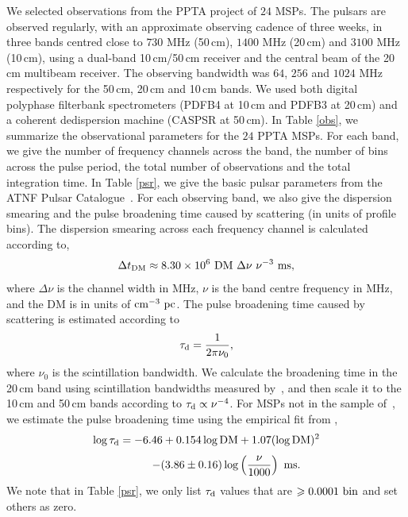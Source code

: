 \documentclass[useAMS,usenatbib]{mn2e}
\begin{document}
We selected observations from the PPTA project of $24$ MSPs. 
%
The pulsars are observed regularly, with an approximate observing cadence of 
three weeks, in three bands centred close to $730$ MHz (50\,cm), $1400$ MHz (20\,cm) and $3100$ MHz (10\,cm), 
using a dual-band 10\,cm/50\,cm receiver and the central beam 
of the 20\,cm multibeam receiver. The observing 
bandwidth was $64$, $256$ and $1024$ MHz respectively for the 50\,cm, 20\,cm 
and 10\,cm bands. 
%
We used both digital polyphase filterbank spectrometers (PDFB4 at 10\,cm 
and PDFB3 at 20\,cm) and a coherent dedispersion machine (CASPSR at 50\,cm). 
%
In Table \ref{obs}, we summarize the observational parameters for the $24$ PPTA MSPs. 
%
For each band, we give the number of frequency channels across 
the band, the number of bins across the pulse period, the total number 
of observations and the total integration time.
%
In Table \ref{psr}, we give the basic pulsar parameters from the ATNF Pulsar 
Catalogue~\citep{Manchester05}.
%
For each observing band, we also give the dispersion smearing and the pulse 
broadening time caused by scattering (in units of profile bins).
%
The dispersion smearing across each frequency channel is calculated according to, 
%
\begin{equation}
\Delta t_{\rm{DM}}\approx 8.30 \times 10^{6}\ \rm{DM}\ \Delta \nu\ \nu^{-3}\ \rm{ms},
\label{dm}
\end{equation}
%
where $\Delta \nu$ is the channel width in MHz, $\nu$ is the band centre frequency in MHz, 
and the DM is in units of $\rm{cm^{-3}\ pc}$.
%
The pulse broadening time caused by scattering is estimated according to
%
\begin{equation}
\tau_{\rm{d}} = \frac{1}{2\pi\nu_0},
\end{equation}
%
where $\nu_0$ is the scintillation bandwidth. We calculate the broadening time 
in the 20\,cm band using scintillation bandwidths measured by~\citet{Keith13}, and 
then scale it to the 10\,cm and 50\,cm bands according to $\tau_{\rm{d}}\propto\nu^{-4}$.
For MSPs not in the sample of~\citet{Keith13}, we estimate the pulse broadening time 
using the empirical fit from \citet{Bhat04}, 
%
\[
\log \tau_{\rm{d}} = -6.46+0.154\log\rm{DM}+1.07(\log\rm{DM})^2
\]
%
\begin{equation}
	\qquad\quad\ \ -(3.86\pm0.16)\log\left(\frac{\nu}{1000}\right)\ \rm{ms}.
\label{scatter}
\end{equation}
%
We note that in Table \ref{psr}, we only list $\tau_{\rm{d}}$ values that are 
$\ge 0.0001\ \rm{bin}$ and set others as zero.
\end{document}
